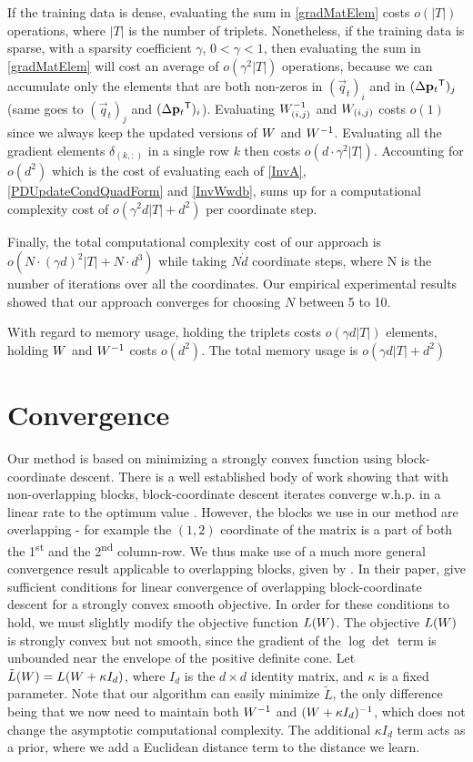 \documentclass{article}
\begin{document}
{If the training data is dense, evaluating the sum in \eqref{gradMatElem} costs $o(|T|)$ operations, where $|T|$ is the number of triplets. Nonetheless, if the training data is sparse, with a sparsity coefficient $\gamma$,  $ 0< \gamma <1 $, then evaluating the sum in \eqref{gradMatElem} will cost an average of $o(\gamma^2 |T|)$ operations, because we can accumulate only the elements that are both non-zeros in $(\vec{q}_{t})_i$ and in $(\Delta\mathbf{p}_{t}{}^\mathsf{T})_j  $ (same goes to $(\vec{q}_{t})_j$ and $(\Delta\mathbf{p}_{t}{}^\mathsf{T})_i$). Evaluating ${W}^{-1}_{(i,j)}$ and ${W}_{(i,j)}$ costs $o(1)$ since we always keep the updated versions of ${W}$ and ${W}^{-1}$. Evaluating all the gradient elements $\delta_{(k,:)}$ in a single row $k$ then costs $o(d\cdot \gamma^2 |T|)$. Accounting for $o(d^2)$ which is the cost of evaluating each of \eqref{InvA}, \eqref{PDUpdateCondQuadForm} and \eqref{InvWwdb}, sums up for a computational complexity cost of $o(\gamma^2 d |T| + d^2)$ per coordinate step.

Finally, the total computational complexity cost of our approach is $o(N \cdot (\gamma d)^2 |T| + N \cdot d^3)$ while taking $N \dot d$ coordinate steps, where N is the number of iterations over all the coordinates. Our empirical experimental results showed that our approach converges for choosing $N$ between 5 to 10. 

With regard to memory usage, holding the triplets costs $o(\gamma d |T|)$ elements, holding ${W}$ and ${W}^{-1}$ costs $o(d^2)$. The total memory usage is $o(\gamma d |T| + d^2)$


\section{Convergence}
Our method is based on minimizing a strongly convex function using block-coordinate descent. There is a well established body of work showing that with non-overlapping blocks, block-coordinate descent iterates converge w.h.p. in a linear rate to the optimum value \cite{nesterov2012efficiency,richtarik2014iteration}.
However, the blocks we use in our method are overlapping - for example the $(1,2)$ coordinate of the matrix is a part of both the 1\textsuperscript{st} and the 2\textsuperscript{nd} column-row. We thus make use of a much more general convergence result applicable to overlapping blocks, given by \citet{richtarik2013optimal}. 
In their paper, \citet{richtarik2013optimal} give sufficient conditions for linear convergence of overlapping block-coordinate descent for a strongly convex smooth objective.
In order for these conditions to hold, we must slightly modify the objective function $L({{W}})$. The objective $L({W})$ is strongly convex but not smooth, since the gradient of the $\log \det$ term is unbounded near the envelope of the positive definite cone. Let $\tilde{L}({{W}}) = L({{W} + \kappa I_d})$, where $I_d$ is the $d \times d$ identity matrix, and $\kappa$ is a fixed parameter.
Note that our algorithm can easily minimize $\tilde{L}$, the only difference being that we now need to maintain both ${W}^{-1}$ and $({W}+\kappa I_d)^{-1}$, which does not change the asymptotic computational complexity. The additional $\kappa I_d$ term acts as a prior, where we add a Euclidean distance term to the distance we learn. 

}
\end{document}
